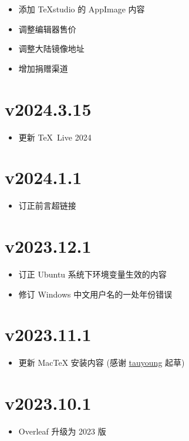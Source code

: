 \begin{itemize}
  \item 添加 \TeX studio 的 AppImage 内容
  \item 调整编辑器售价
  \item 调整大陆镜像地址
  \item 增加捐赠渠道
\end{itemize}

\section*{v2024.3.15}

\begin{itemize}
  \item 更新 \TeX~Live 2024
\end{itemize}

\section*{v2024.1.1}

\begin{itemize}
  \item 订正前言超链接
\end{itemize}

\section*{v2023.12.1}

\begin{itemize}
  \item 订正 Ubuntu 系统下环境变量生效的内容
  \item 修订 Windows 中文用户名的一处年份错误
\end{itemize}

\section*{v2023.11.1}

\begin{itemize}
  \item 更新 MacTeX 安装内容 (感谢 \href{https://github.com/tauyoungsama}{tauyoung} 起草)
\end{itemize}

\section*{v2023.10.1}

\begin{itemize}
  \item Overleaf 升级为 2023 版
\end{itemize}

